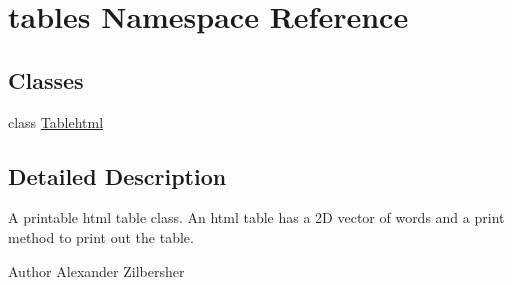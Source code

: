 \hypertarget{namespacetables}{}\section{tables Namespace Reference}
\label{namespacetables}
\subsection*{Classes}
\begin{DoxyCompactItemize}
\item 
class \hyperlink{classtables_1_1_tablehtml}{Tablehtml}
\end{DoxyCompactItemize}


\subsection{Detailed Description}
A printable html table class. An html table has a 2D vector of words and a print method to print out the table.

\begin{DoxyAuthor}{Author}
Alexander Zilbersher 
\end{DoxyAuthor}
